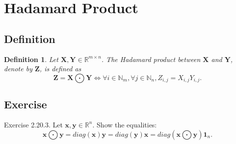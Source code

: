 \documentclass{article}
\theoremstyle{plain}
\newtheorem{dfn}{Definition}[subsection]
\begin{document}
\section{Hadamard Product}

\subsection{Definition}

\begin{dfn}
	Let $\bm{X} , \bm{Y} \in \mathbb{R}^{m \times n}$. The Hadamard product between
	$\bm{X}$ and $\bm{Y}$, denote by $\bm{Z}$, is defined as
	\begin{equation}
		\label{dfn_hadamard}
		\bm{Z} = \bm{X} \bigodot \bm{Y} \iff \forall i \in \mathbb{N}_m , \forall j \in \mathbb{N}_n ,
		Z_{i,j} = X_{i,j} Y_{i,j} .
	\end{equation}
\end{dfn}


\subsection{Exercise}

\begin{itembox}[l]{Exercise 2.20.3.}
	Let $\bm{x} , \bm{y} \in \mathbb{R}^n$. Show the equalities:
	\begin{equation}
		\label{ex2203}
		\bm{x} \bigodot \bm{y} = diag(\bm{x}) \bm{y} = diag(\bm{y}) \bm{x}
		= diag(\bm{x} \bigodot \bm{y}) \bm{1}_n .
	\end{equation}
\end{itembox}
\end{document}
